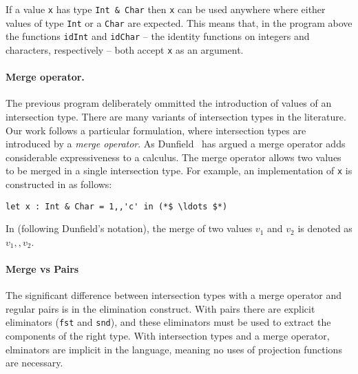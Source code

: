 \noindent If a value \lstinline{x} has type \lstinline{Int & Char} then
\lstinline{x} can be used anywhere where either values of type \lstinline{Int} or a 
\lstinline{Char} are expected. 
This means that, in the program above
the functions \lstinline{idInt} and \lstinline{idChar} -- the
identity functions on integers and characters, respectively -- 
both accept \lstinline{x} as an argument. 

\paragraph{Merge operator.}
The previous program deliberately ommitted the introduction of values of an
intersection type. 
There are many variants of intersection types in the literature. 
Our work follows a particular formulation, where
intersection types are introduced by a \emph{merge operator}. 
As Dunfield~\cite{dunfield2014elaborating} has argued a merge operator adds considerable
expressiveness to a calculus. 
The merge operator allows two values to be merged in a single intersection type. 
For example, an implementation of \lstinline{x} is constructed in \name as follows:

\begin{lstlisting}
let x : Int & Char = 1,,'c' in (*$ \ldots $*)
\end{lstlisting}
\noindent In \name (following Dunfield's notation), the
merge of two values $v_1$ and $v_2$ is denoted as $v_1 ,, v_2$.

\paragraph{Merge vs Pairs}
The significant difference between intersection types with a
merge operator and regular pairs is in the elimination construct. 
With pairs there are explicit eliminators (\lstinline{fst} and
\lstinline{snd}), and these eliminators must be used to extract the
components of the right type.
With intersection types and a merge operator, elminators are implicit in the language,
meaning no uses of projection functions are necessary.


